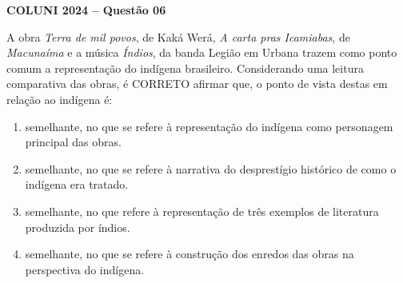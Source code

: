 \textbf{COLUNI 2024 -- Questão 06}\par\medskip A obra \textit{Terra de mil povos}, de Kaká Werá, \textit{A carta pras Icamiabas}, de \textit{Macunaíma} e a música \textit{Índios}, da banda Legião em Urbana trazem como ponto comum a representação do indígena brasileiro. Considerando uma leitura comparativa das obras, é CORRETO afirmar que, o ponto de vista destas em relação ao indígena é:\begin{enumerate}
\item semelhante, no que se refere à representação do indígena como personagem principal das obras.
\item semelhante, no que se refere à narrativa do desprestígio histórico de como o indígena era tratado.
\item semelhante, no que refere à representação de três exemplos de literatura produzida por índios.
\item semelhante, no que se refere à construção dos enredos das obras na perspectiva do indígena.\end{enumerate}
